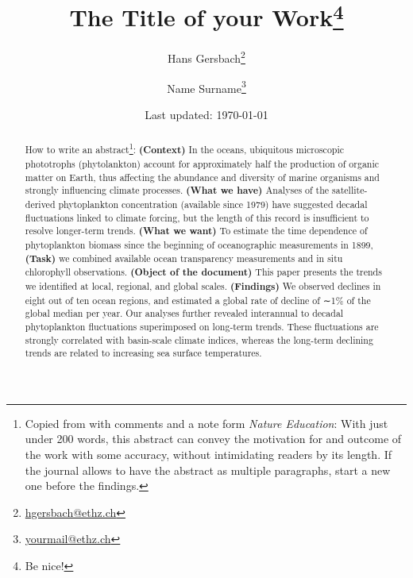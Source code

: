 \documentclass[
	12pt, %
	a4paper, %
	]{article}
\theoremstyle{break} %
\begin{document}
\begin{titlepage}
\singlespacing
\title{
	The Title of your Work\thanks{Be nice!}
}

\newcommand{\mailto}[1]{\thanks{\href{mailto:#1}{#1}}}
\renewcommand\Affilfont{\small}


\author[a]{Hans Gersbach\mailto{hgersbach@ethz.ch}}
\author[a]{Name Surname\mailto{yourmail@ethz.ch}}

\date{Last updated: \today}

\maketitle

\begin{abstract}
	\noindent
	How to write an abstract\footnote{
		Copied from \cite{boyce2010global} with comments and a note form \textit{Nature Education}:
		With just under 200 words, this abstract can convey the motivation for and outcome of the work with some accuracy, without intimidating readers by its length.
		If the journal allows to have the abstract as multiple paragraphs, start a new one before the findings.
	}: \textbf{(Context)} In the oceans, ubiquitous microscopic phototrophs (phytolankton) account for approximately half the production of organic matter on Earth, thus affecting the abundance and diversity of marine organisms and strongly influencing
	climate processes.
	\textbf{(What we have)} Analyses of the satellite-derived phytoplankton concentration (available since 1979) have suggested decadal fluctuations linked to climate forcing, but the length of this record is insufficient to resolve longer-term trends.
	\textbf{(What we want)} To estimate the time dependence of phytoplankton biomass since the beginning of oceanographic measurements in 1899, 
	\textbf{(Task)}	we combined available ocean transparency measurements and in situ chlorophyll observations.
	\textbf{(Object of the document)} This paper presents the trends we identified at local, regional, and global scales.
	\textbf{(Findings)} We observed declines in eight out of ten ocean regions, and estimated a global rate of decline of ∼1\% of the global median
	per year. Our analyses further revealed interannual to decadal phytoplankton fluctuations superimposed on long-term trends.
	These fluctuations are strongly correlated with basin-scale climate indices, whereas the long-term declining trends are	related to increasing sea surface temperatures.

\end{abstract}
\end{titlepage}
\end{document}
